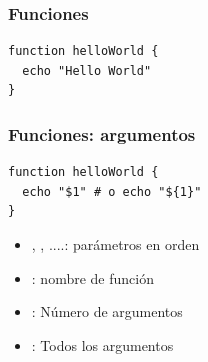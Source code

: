 \documentclass[14pt,aspectratio=169,xcolor=dvipsnames]{beamer}
\begin{document}
\begin{frame}[fragile]\frametitle{Funciones}
    \begin{verbatim}
function helloWorld {
  echo "Hello World"
}
    \end{verbatim}
\end{frame}
\begin{frame}[fragile]\frametitle{Funciones: argumentos}
    \begin{verbatim}
function helloWorld {
  echo "$1" # o echo "${1}"
}
    \end{verbatim}
    \begin{itemize}
        \item {}, , ....: parámetros en orden
        \item {}: nombre de función
        \item \code{\$\#}: Número de argumentos   
        \item {}: Todos los argumentos
    \end{itemize}
\end{frame}
\end{document}
